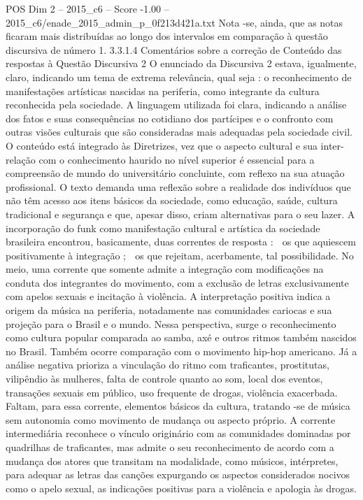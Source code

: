 \begin{textsample}{POS Dim 2 – 2015\_c6 – Score -1.00 – 2015\_c6/enade\_2015\_admin\_p\_0f213d421a.txt}
Nota -se, ainda, que as notas ficaram mais distribuídas ao longo dos intervalos em comparação à questão discursiva de número 1. 3.3.1.4 Comentários sobre a correção de Conteúdo das respostas à Questão Discursiva 2 O enunciado da Discursiva 2 estava, igualmente, claro, indicando um tema de extrema relevância, qual seja : o reconhecimento de manifestações artísticas nascidas na periferia, como integrante da cultura reconhecida pela sociedade.
A linguagem utilizada foi clara, indicando a análise dos fatos e suas consequências no cotidiano dos partícipes e o confronto com outras visões culturais que são consideradas mais adequadas pela sociedade civil.
O conteúdo está integrado às Diretrizes, vez que o aspecto cultural e sua inter-relação com o conhecimento haurido no nível superior é essencial para a compreensão de mundo do universitário concluinte, com reflexo na sua atuação profissional.
O texto demanda uma reflexão sobre a realidade dos indivíduos que não têm acesso aos itens básicos da sociedade, como educação, saúde, cultura tradicional e segurança e que, apesar disso, criam alternativas para o seu lazer.
A incorporação do funk como manifestação cultural e artística da sociedade brasileira encontrou, basicamente, duas correntes de resposta :  os que aquiescem positivamente à integração ;  os que rejeitam, acerbamente, tal possibilidade.
No meio, uma corrente que somente admite a integração com modificações na conduta dos integrantes do movimento, com a exclusão de letras exclusivamente com apelos sexuais e incitação à violência.
A interpretação positiva indica a origem da música na periferia, notadamente nas comunidades cariocas e sua projeção para o Brasil e o mundo.
Nessa perspectiva, surge o reconhecimento como cultura popular comparada ao samba, axé e outros ritmos também nascidos no Brasil.
Também ocorre comparação com o movimento hip-hop americano.
Já a análise negativa prioriza a vinculação do ritmo com traficantes, prostitutas, vilipêndio às mulheres, falta de controle quanto ao som, local dos eventos, transações sexuais em público, uso frequente de drogas, violência exacerbada.
Faltam, para essa corrente, elementos básicos da cultura, tratando -se de música sem autonomia como movimento de mudança ou aspecto próprio.
A corrente intermediária reconhece o vínculo originário com as comunidades dominadas por quadrilhas de traficantes, mas admite o seu reconhecimento de acordo com a mudança dos atores que transitam na modalidade, como músicos, intérpretes, para adequar as letras das canções expurgando os aspectos considerados nocivos como o apelo sexual, as indicações positivas para a violência e apologia às drogas.

\end{textsample}
